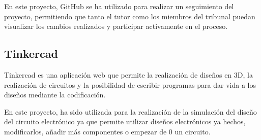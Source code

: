En este proyecto, GitHub se ha utilizado para realizar un seguimiento del proyecto, permitiendo que tanto el tutor como los miembros del tribunal puedan visualizar los cambios realizados y participar activamente en el proceso.
\subsection{Tinkercad}
Tinkercad es una aplicación web que permite la realización de diseños en 3D, la realización de circuitos y la posibilidad de escribir programas para dar vida a los diseños mediante la codificación.

En este proyecto, ha sido utilizada para la realización de la simulación del diseño del circuito electrónico ya que permite utilizar diseños electrónicos ya hechos, modificarlos, añadir más componentes o empezar de 0 un circuito.
